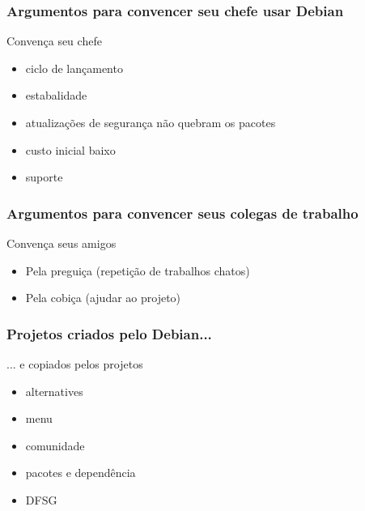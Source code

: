 \documentclass{beamer}
\begin{document}
\begin{frame}
    \frametitle{Argumentos para convencer seu chefe usar Debian}
        \begin{block}{Convença seu chefe}
	 \begin{itemize}
	    \item ciclo de lançamento
	    \item estabalidade
	    \item atualizações de segurança não quebram os pacotes
	    \item custo inicial baixo
	    \item suporte
         \end{itemize}
    \end{block}
\end{frame}

\begin{frame}
    \frametitle{Argumentos para convencer seus colegas de trabalho}
        \begin{block}{Convença seus amigos}
	 \begin{itemize}
	    \item Pela preguiça (repetição de trabalhos chatos)
	    \item Pela cobiça (ajudar ao projeto)
         \end{itemize}
    \end{block}
\end{frame}


\begin{frame}
    \frametitle{Projetos criados pelo Debian...}
        \begin{block}{... e copiados pelos projetos }
	 \begin{itemize}
	    \item alternatives
	    \item menu
	    \item comunidade
	    \item pacotes e dependência
	    \item DFSG
         \end{itemize}
    \end{block}
\end{frame}
\end{document}

